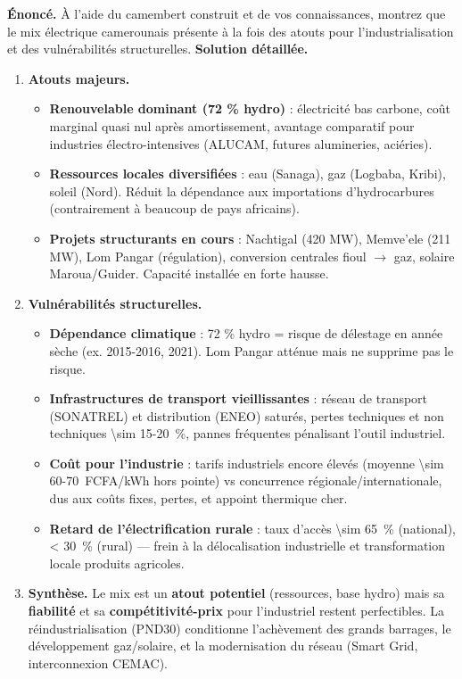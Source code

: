 \documentclass[11pt]{article}
\begin{document}
\begin{exoresolu}
\textbf{Énoncé.} À l'aide du camembert construit et de vos connaissances, montrez que le mix électrique camerounais présente à la fois des atouts pour l'industrialisation et des vulnérabilités structurelles.
\tcblower
\textbf{Solution détaillée.}
\begin{enumerate}
\item \textbf{Atouts majeurs.}
      \begin{itemize}
      \item \textbf{Renouvelable dominant (72 \% hydro)} : électricité bas carbone, coût marginal quasi nul après amortissement, avantage comparatif pour industries électro-intensives (ALUCAM, futures alumineries, aciéries).
      \item \textbf{Ressources locales diversifiées} : eau (Sanaga), gaz (Logbaba, Kribi), soleil (Nord). Réduit la dépendance aux importations d'hydrocarbures (contrairement à beaucoup de pays africains).
      \item \textbf{Projets structurants en cours} : Nachtigal (420 MW), Memve'ele (211 MW), Lom Pangar (régulation), conversion centrales fioul $\rightarrow$ gaz, solaire Maroua/Guider. Capacité installée en forte hausse.
      \end{itemize}
\item \textbf{Vulnérabilités structurelles.}
      \begin{itemize}
      \item \textbf{Dépendance climatique} : 72 \% hydro = risque de délestage en année sèche (ex. 2015-2016, 2021). Lom Pangar atténue mais ne supprime pas le risque.
      \item \textbf{Infrastructures de transport vieillissantes} : réseau de transport (SONATREL) et distribution (ENEO) saturés, pertes techniques et non techniques \SI{\sim 15-20}{\%}, pannes fréquentes pénalisant l'outil industriel.
      \item \textbf{Coût pour l'industrie} : tarifs industriels encore élevés (moyenne \SI{\sim 60-70}{FCFA/kWh} hors pointe) vs concurrence régionale/internationale, dus aux coûts fixes, pertes, et appoint thermique cher.
      \item \textbf{Retard de l'électrification rurale} : taux d'accès \SI{\sim 65}{\%} (national), \SI{< 30}{\%} (rural) — frein à la délocalisation industrielle et transformation locale produits agricoles.
      \end{itemize}
\item \textbf{Synthèse.} Le mix est un \textbf{atout potentiel} (ressources, base hydro) mais sa \textbf{fiabilité} et sa \textbf{compétitivité-prix} pour l'industriel restent perfectibles. La réindustrialisation (PND30) conditionne l'achèvement des grands barrages, le développement gaz/solaire, et la modernisation du réseau (Smart Grid, interconnexion CEMAC).
\end{enumerate}
\end{exoresolu}
\end{document}
